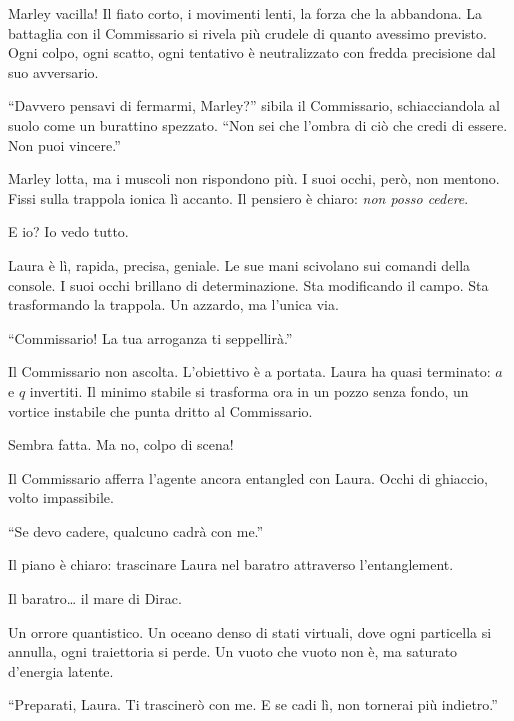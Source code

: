 Marley vacilla! Il fiato corto, i movimenti lenti, la forza che la abbandona. La battaglia con il Commissario si rivela più crudele di quanto avessimo previsto. Ogni colpo, ogni scatto, ogni tentativo è neutralizzato con fredda precisione dal suo avversario.

\begin{dialogue}
 \enquote{Davvero pensavi di fermarmi, Marley?} sibila il Commissario, schiacciandola al suolo come un burattino spezzato. \enquote{Non sei che l’ombra di ciò che credi di essere. Non puoi vincere.}
\end{dialogue}

Marley lotta, ma i muscoli non rispondono più. I suoi occhi, però, non mentono. Fissi sulla trappola ionica lì accanto. Il pensiero è chiaro: \textit{non posso cedere}.

E io? Io vedo tutto.

Laura è lì, rapida, precisa, geniale. Le sue mani scivolano sui comandi della console. I suoi occhi brillano di determinazione. Sta modificando il campo. Sta trasformando la trappola. Un azzardo, ma l’unica via.

\begin{dialogue}
 \enquote{Commissario! La tua arroganza ti seppellirà.}
\end{dialogue}

Il Commissario non ascolta. L’obiettivo è a portata. Laura ha quasi terminato: $a$ e $q$ invertiti. Il minimo stabile si trasforma ora in un pozzo senza fondo, un vortice instabile che punta dritto al Commissario.

Sembra fatta. Ma no, colpo di scena!

Il Commissario afferra l’agente ancora entangled con Laura. Occhi di ghiaccio, volto impassibile.

\begin{dialogue}
 \enquote{Se devo cadere, qualcuno cadrà con me.}
\end{dialogue}

Il piano è chiaro: trascinare Laura nel baratro attraverso l'entanglement.

Il baratro… il mare di Dirac.

Un orrore quantistico. Un oceano denso di stati virtuali, dove ogni particella si annulla, ogni traiettoria si perde. Un vuoto che vuoto non è, ma saturato d’energia latente.

\begin{dialogue}
 \enquote{Preparati, Laura. Ti trascinerò con me. E se cadi lì, non tornerai più indietro.}
\end{dialogue}

